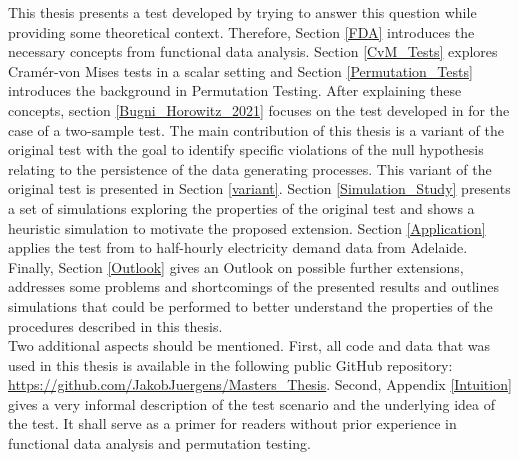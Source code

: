 \documentclass[12pt, a4paper]{article}
\theoremstyle{MAstyle} \newtheorem{assumption}{Assumption}[section]
\theoremstyle{MAstyle} \newtheorem{definition}{Definition}[section]
\theoremstyle{MAstyle} \newtheorem{theorem}{Theorem}[section]
\begin{document}
		This thesis presents a test developed by \cite{bugni_permutation_2021} trying to answer this question while providing some theoretical context. Therefore, Section \ref{FDA} introduces the necessary concepts from functional data analysis. 
		Section \ref{CvM_Tests} explores Cram\'{e}r-von Mises tests in a scalar setting and Section \ref{Permutation_Tests} introduces the background in Permutation Testing.
		After explaining these concepts, section \ref{Bugni_Horowitz_2021} focuses on the test developed in \cite{bugni_permutation_2021} for the case of a two-sample test.
		The main contribution of this thesis is a variant of the original test with the goal to identify specific violations of the null hypothesis relating to the persistence of the data generating processes. This variant of the original test is presented in Section \ref{variant}.
		Section \ref{Simulation_Study} presents a set of simulations exploring the properties of the original test and shows a heuristic simulation to motivate the proposed extension. 
		Section \ref{Application} applies the test from \cite{bugni_permutation_2021} to half-hourly electricity demand data from Adelaide.
		Finally, Section \ref{Outlook} gives an Outlook on possible further extensions, addresses some problems and shortcomings of the presented results and outlines simulations that could be performed to better understand the properties of the procedures described in this thesis.\\
		
		Two additional aspects should be mentioned. First, all code and data that was used in this thesis is available in the following public GitHub repository: \url{https://github.com/JakobJuergens/Masters_Thesis}. 
		Second, Appendix \ref{Intuition} gives a very informal description of the test scenario and the underlying idea of the test. It shall serve as a primer for readers without prior experience in functional data analysis and permutation testing. 
	
\end{document}
